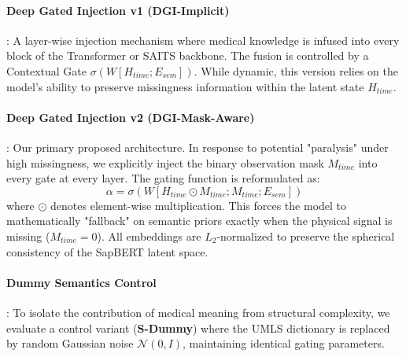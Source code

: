 \paragraph{Deep Gated Injection v1 (DGI-Implicit)}: A layer-wise injection mechanism where medical knowledge is infused into every block of the Transformer or SAITS backbone. The fusion is controlled by a Contextual Gate $\sigma(W[H_{time}; E_{sem}])$. While dynamic, this version relies on the model's ability to preserve missingness information within the latent state $H_{time}$.

\paragraph{Deep Gated Injection v2 (DGI-Mask-Aware)}: Our primary proposed architecture. In response to potential "paralysis" under high missingness, we explicitly inject the binary observation mask $M_{time}$ into every gate at every layer. The gating function is reformulated as:
\begin{equation}
    \alpha = \sigma(W[H_{time} \odot M_{time}; M_{time}; E_{sem}])
\end{equation}
where $\odot$ denotes element-wise multiplication. This forces the model to mathematically "fallback" on semantic priors exactly when the physical signal is missing ($M_{time}=0$). All embeddings are $L_2$-normalized to preserve the spherical consistency of the SapBERT latent space.

\paragraph{Dummy Semantics Control}: To isolate the contribution of medical meaning from structural complexity, we evaluate a control variant (\textbf{S-Dummy}) where the UMLS dictionary is replaced by random Gaussian noise $\mathcal{N}(0, I)$, maintaining identical gating parameters.
